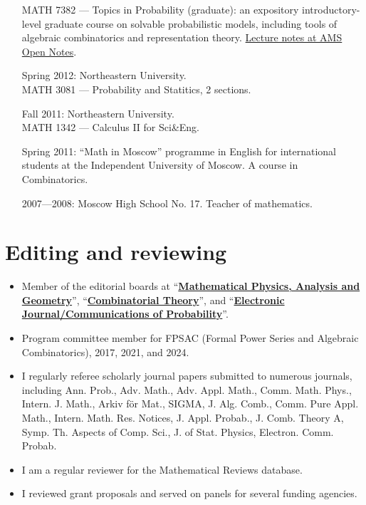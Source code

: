 \documentclass[letterpaper,11pt]{article}
\begin{document}
\begin{itemize}
	      MATH 7382 --- Topics in Probability (graduate): an expository
	      introductory-level graduate course on solvable probabilistic models, including
	      tools of algebraic combinatorics and representation theory.
		  \href{https://www.ams.org/open-math-notes/omn-view-listing?listingId=110813}{Lecture notes at AMS Open Notes}.

	\item
	      [Spring 2012:]
	      Northeastern University. \\ MATH 3081 --- Probability and
	      Statitics, 2 sections.
	\item
	      [Fall 2011:]
	      Northeastern University.\\ MATH 1342 --- Calculus II for
	      Sci\&Eng.
	\item
	      [Spring 2011:]
	      ``Math in Moscow'' programme in English for international
	      students at the Independent University of Moscow. A course in
	      Combinatorics.

	\item
	      [2007---2008:]
	      Moscow High School No. 17. Teacher of mathematics.
\end{itemize}

\section*{Editing and reviewing}

\begin{itemize}
	\item
	Member of the editorial boards at ``\href{https://www.springer.com/journal/11040}{\textbf{Mathematical Physics, Analysis and Geometry}}'', ``\href{https://escholarship.org/uc/combinatorial_theory/}{\textbf{Combinatorial Theory}}'', and ``\href{https://imstat.org/journals-and-publications/electronic-journal-of-probability/}{\textbf{Electronic Journal/Communications of Probability}}''.
	\item Program committee member for FPSAC (Formal Power Series and Algebraic Combinatorics),
		2017, 2021, and 2024.
	\item 
	I regularly referee scholarly journal papers submitted to numerous journals, 
	including
	Ann. Prob., Adv. Math., Adv. Appl. Math., Comm. Math. Phys., Intern. J. Math.,
	Arkiv f\"or Mat., SIGMA, J. Alg. Comb., Comm. Pure Appl. Math., Intern. Math.
	Res. Notices, J. Appl. Probab., J. Comb. Theory A, Symp. Th. Aspects of Comp.
	Sci., J. of Stat. Physics, Electron. Comm. Probab. 
	\item
	I am a regular
	reviewer for the Mathematical Reviews database. 
	\item
	I reviewed grant proposals and served on panels for several funding agencies.
\end{itemize}
\end{document}
